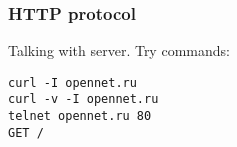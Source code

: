 \begin{frame}[fragile]
\frametitle{HTTP protocol}
Talking with server. Try commands:
\begin{lstlisting}
curl -I opennet.ru
curl -v -I opennet.ru
telnet opennet.ru 80
GET /
\end{lstlisting}


\end{frame}
